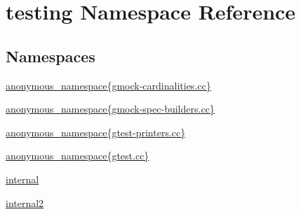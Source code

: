 \hypertarget{namespacetesting}{}\section{testing Namespace Reference}
\label{namespacetesting}
\subsection*{Namespaces}
\begin{DoxyCompactItemize}
\item 
 \hyperlink{namespacetesting_1_1anonymous__namespace_02gmock-cardinalities_8cc_03}{anonymous\+\_\+namespace\{gmock-\/cardinalities.\+cc\}}
\item 
 \hyperlink{namespacetesting_1_1anonymous__namespace_02gmock-spec-builders_8cc_03}{anonymous\+\_\+namespace\{gmock-\/spec-\/builders.\+cc\}}
\item 
 \hyperlink{namespacetesting_1_1anonymous__namespace_02gtest-printers_8cc_03}{anonymous\+\_\+namespace\{gtest-\/printers.\+cc\}}
\item 
 \hyperlink{namespacetesting_1_1anonymous__namespace_02gtest_8cc_03}{anonymous\+\_\+namespace\{gtest.\+cc\}}
\item 
 \hyperlink{namespacetesting_1_1internal}{internal}
\item 
 \hyperlink{namespacetesting_1_1internal2}{internal2}
\end{DoxyCompactItemize}
